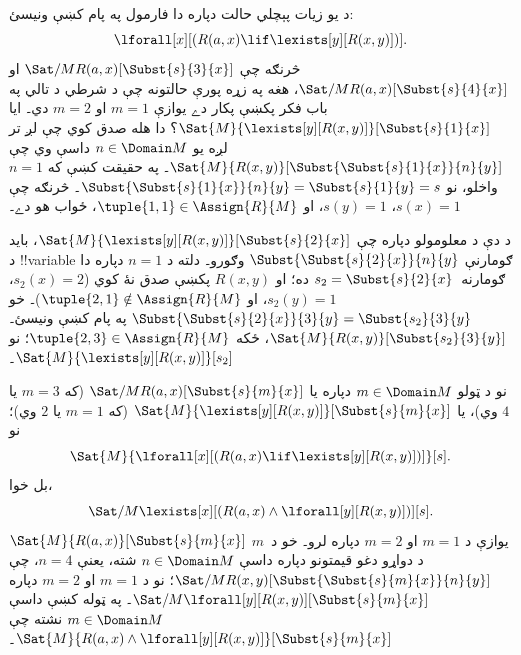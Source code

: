 \documentclass[../../../include/open-logic-section]{subfiles}
\begin{document}
\begin{ex}

د يو زيات پېچلي حالت دپاره دا فارمول په پام کښې ونيسئ:
\[
\lforall[x][(R(a,x) \lif \lexists[y][R(x,y)])].
\]
څرنګه چې $\Sat/{M}{R(a,x)}[\Subst{s}{3}{x}]$ او
$\Sat/{M}{R(a,x)}[\Subst{s}{4}{x}]$، هغه په زړه پورې حالتونه چې د
شرطي د تالي په باب فکر پکښې پکار دے يوازې $m = 1$ او $m = 2$ دي۔
ايا $\Sat{M}{\lexists[y][R(x,y)]}[\Subst{s}{1}{x}]$؟ دا هله صدق کوي
چې لږ تر لږه يو $n \in \Domain M$ داسې وي چې
$\Sat{M}{R(x,y)}[\Subst{\Subst{s}{1}{x}}{n}{y}]$۔ په حقيقت کښې که
$n = 1$ واخلو، نو
$\Subst{\Subst{s}{1}{x}}{n}{y} = \Subst{s}{1}{y} = s$۔ څرنګه چې
$s(x) = 1$، $s(y) = 1$، او $\tuple{1,1} \in \Assign{R}{M}$، ځواب هو
دے۔

د دې د معلومولو دپاره چې
$\Sat{M}{\lexists[y][R(x,y)]}[\Subst{s}{2}{x}]$، بايد د
!!{variable} ګومارنې $\Subst{\Subst{s}{2}{x}}{n}{y}$ وګورو۔ دلته
د $n = 1$ دپاره دا ګومارنه~$s_2 = \Subst{s}{2}{x}$ ده؛ او
$R(x,y)$ پکښې صدق نۀ کوي ($s_2(x) = 2$، $s_2(y) = 1$، او
$\tuple{2,1}\notin \Assign{R}{M}$)۔ خو
$\Subst{\Subst{s}{2}{x}}{3}{y} = \Subst{s_2}{3}{y}$ په پام کښې
ونيسئ۔ $\Sat{M}{R(x,y)}[\Subst{s_2}{3}{y}]$، ځکه
$\tuple{2,3} \in \Assign{R}{M}$؛ نو
$\Sat{M}{\lexists[y][R(x,y)]}[s_2]$۔

نو د ټولو $m \in \Domain M$ دپاره يا
$\Sat/{M}{R(a,x)}[\Subst{s}{m}{x}]$ (که $m = 3$ يا $4$ وي)، يا
$\Sat{M}{\lexists[y][R(x,y)]}[\Subst{s}{m}{x}]$ (که $m = 1$ يا $2$
وي)؛ نو
\[
\Sat{M}{\lforall[x][(R(a,x) \lif \lexists[y][R(x,y)])]}[s].
\]
بل خوا،
\[
\Sat/{M}{\lexists[x][(R(a,x) \land \lforall[y][R(x,y)])]}[s].
\]
$\Sat{M}{R(a,x)}[\Subst{s}{m}{x}]$ يوازې د $m = 1$ او $m = 2$
دپاره لرو۔ خو د~$m$ د دواړو دغو قيمتونو دپاره داسې
$n \in \Domain M$ شته، يعنې $n = 4$، چې
$\Sat/{M}{R(x,y)}[\Subst{\Subst{s}{m}{x}}{n}{y}]$؛ نو د $m = 1$ او
$m = 2$ دپاره
$\Sat/{M}{\lforall[y][R(x,y)]}[\Subst{s}{m}{x}]$۔ په ټوله کښې داسې
$m \in \Domain M$ نشته چې
$\Sat{M}{R(a,x) \land \lforall[y][R(x,y)]}[\Subst{s}{m}{x}]$۔
\end{ex}
\end{document}
